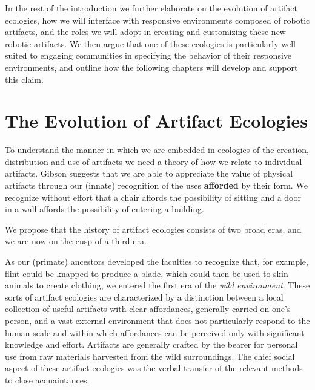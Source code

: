 In the rest of the introduction we further elaborate on the evolution of artifact ecologies, how we will interface with responsive environments composed of robotic artifacts, and the roles we will adopt in creating and customizing these new robotic artifacts.
We then argue that one of these ecologies is particularly well suited to engaging communities in specifying the behavior of their responsive environments, and outline how the following chapters will develop and support this claim.

\section{The Evolution of Artifact Ecologies}
%
To understand the manner in which we are embedded in ecologies of the creation, distribution and use of artifacts we need a theory of how we relate to individual artifacts.
Gibson \citeyearpar{gibson_1979} suggests that we are able to appreciate the value of physical artifacts through our (innate) recognition of the uses \textbf{afforded} by their form.
We recognize without effort that a chair affords the possibility of sitting and a door in a wall affords the possibility of entering a building. 

We propose that the history of artifact ecologies consists of two broad eras, and we are now on the cusp of a third era.

As our (primate) ancestors developed the faculties to recognize that, for example, flint could be knapped to produce a blade, which could then be used to skin animals to create clothing, we entered the first era of the \emph{wild environment}. 
These sorts of artifact ecologies are characterized by a distinction between a local collection of useful artifacts with clear affordances, generally carried on one's person, and a vast external environment that does not particularly respond to the human scale and within which affordances can be perceived only with significant knowledge and effort.
Artifacts are generally crafted by the bearer for personal use from raw materials harvested from the wild surroundings. 
The chief social aspect of these artifact ecologies was the verbal transfer of the relevant methods to close acquaintances.

